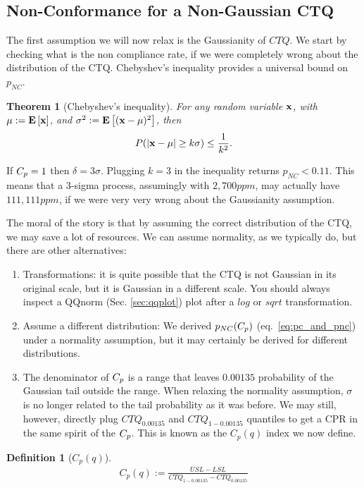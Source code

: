 \documentclass[12pt,a4paper]{report}
\theoremstyle{plain}
\newtheorem{theorem}{Theorem}[section]
\theoremstyle{definition}
\newtheorem{definition}{Definition}
\newcommand{\pnc}{p_{NC}}
\newcommand{\cpq}{C_p(q)}
\begin{document}
\subsection{Non-Conformance for a Non-Gaussian CTQ}
The first assumption we will now relax is the Gaussianity of $CTQ$. 
We start by checking what is the non compliance rate, if we were completely wrong about the distribution of the CTQ. 
Chebyshev's inequality provides a universal bound on $\pnc$.


\begin{theorem}[Chebyshev's inequality]
For any random variable $\mathbf{x}$, with $\mu:=\mathbf{E}\left[ \mathbf{x} \right]$, and $\sigma^2:=\mathbf{E}\left[ (\mathbf{x}-\mu)^2 \right]$, then
\begin{align}
	P(|\mathbf{x}-\mu| \geq k\sigma) \leq \frac{1}{k^2}.
\end{align}
\end{theorem}
If $C_p=1$  then $\delta=3\sigma$. Plugging $k=3$ in the inequality returns $\pnc<0.11$.
This means that a 3-sigma process, assumingly with $2,700 ppm$, may actually have $111,111 ppm$, if we were very very wrong about the Gaussianity assumption.



The moral of the story is that by assuming the correct distribution of the CTQ, we may save a lot of resources. 
We can assume normality, as we typically do, but there are other alternatives:
\begin{enumerate}
\item Transformations: it is quite possible that the CTQ is not Gaussian in its original scale, but it is Gaussian in a different scale. You should always inspect a QQnorm (Sec. \ref{sec:qqplot}) plot after a $log$ or $sqrt$ transformation.
\item Assume a different distribution: We derived $\pnc(\cp)$ (eq.~\ref{eq:pc_and_pnc}) under a normality assumption, but it may certainly be derived for different distributions. 
\item The denominator of $C_p$ is a range that leaves $0.00135$ probability of the Gaussian tail outside the range. 
When relaxing the normality assumption, $\sigma$ is no longer related to the tail probability as it was before. We may still, however, directly plug $CTQ_{0.00135}$ and $CTQ_{1-0.00135}$ quantiles to get a CPR in the same spirit of the $C_p$. This is known as the $\cpq$ index we now define.
\end{enumerate}

\begin{definition}[$\cpq$]
\begin{align}
	\cpq:= \frac{USL-LSL}{CTQ_{1-0.00135}-CTQ_{0.00135}}
\end{align}
\end{definition}
\end{document}
